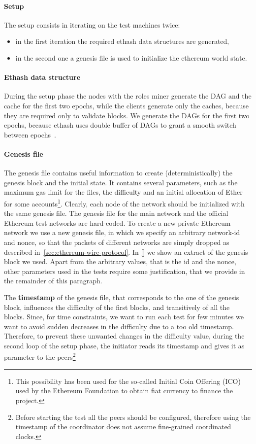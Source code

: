 \paragraph{Setup}
The setup consists in iterating on the test machines twice:
\begin{itemize}
  \item in the first iteration the required ethash data structures are generated,
  \item in the second one a genesis file is used to initialize the ethereum world
  state.
\end{itemize}


\paragraph{Ethash data structure}
During the setup phase the nodes with the roles miner generate the DAG and the
cache for the first two epochs, while the clients generate only the caches,
because they are required only to validate blocks. We generate the DAGs for the
first two epochs, because ethash uses double buffer of DAGs to grant a smooth
switch between epochs~\cite{bib:dagger-hashimoto}.


\paragraph{Genesis file}
The genesis file contains useful information to create (deterministically) the
genesis block and the initial state. It contains several parameters, such as the
maximum gas limit for the files, the difficulty and an initial allocation of
Ether for some accounts\footnote{This possibility has been used for the
so-called Initial Coin Offering (ICO) used by the Ethereum Foundation to obtain
fiat currency to finance the project.}. Clearly, each node of the network should
be initialized with the same genesis file. The genesis file for the main network
and the official Ethereum test networks are hard-coded. To create a new private
Ethereum network we use a new genesis file, in which we specify an arbitrary
network-id and nonce, so that the packets of different networks are simply
dropped as described in~\autoref{sec:ethereum-wire-protocol}. In \autoref{} we
show an extract of the genesis block we used. Apart from the arbitrary values,
that is the id and the nonce, other parameters used in the tests require some
justification, that we provide in the remainder of this paragraph.

The \textbf{timestamp} of the genesis file, that corresponds to the one of the
genesis block, influences the difficulty of the first blocks, and transitively
of all the blocks. Since, for time constraints, we want to run each test for few
minutes we want to avoid sudden decreases in the difficulty due to a too old
timestamp. Therefore, to prevent these unwanted changes in the difficulty value,
during the second loop of the setup phase, the initiator reads its timestamp and
gives it as parameter to the peers\footnote{Before starting the test all the
peers should be configured, therefore using the timestamp of the coordinator
does not assume fine-grained coordinated clocks.}

